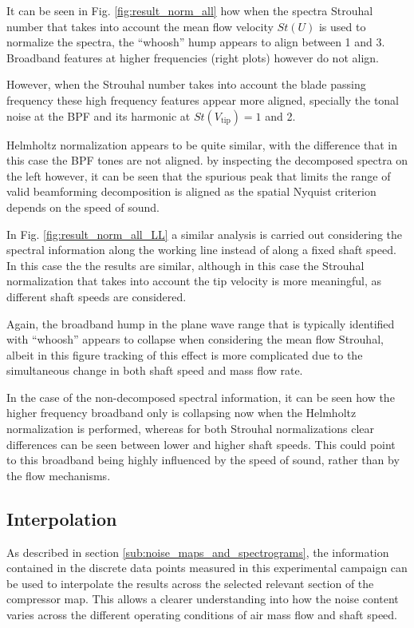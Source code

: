 It can be seen in Fig. \ref{fig:result_norm_all} how when the spectra Strouhal number that takes into account the mean flow velocity $St(U)$ is used to normalize the spectra, the ``whoosh'' hump appears to align between 1 and 3. Broadband features at higher frequencies (right plots) however do not align.

However, when the Strouhal number takes into account the blade passing frequency these high frequency features appear more aligned, specially the tonal noise at the BPF and its harmonic at $St(V_\text{tip})=1$ and 2. 

Helmholtz normalization appears to be quite similar, with the difference that in this case the BPF tones are not aligned. by inspecting the decomposed spectra on the left however, it can be seen that the spurious peak that limits the range of valid beamforming decomposition is aligned as the spatial Nyquist criterion depends on the speed of sound.

In Fig. \ref{fig:result_norm_all_LL} a similar analysis is carried out considering the spectral information along the working line instead of along a fixed shaft speed. In this case the the results are similar, although in this case the Strouhal normalization that takes into account the tip velocity is more meaningful, as different shaft speeds are considered.

Again, the broadband hump in the plane wave range that is typically identified with ``whoosh'' appears to collapse when considering the mean flow Strouhal, albeit in this figure tracking of this effect is more complicated due to the simultaneous change in both shaft speed and mass flow rate. 

In the case of the non-decomposed spectral information, it can be seen how the higher frequency broadband only is collapsing now when the Helmholtz normalization is performed, whereas for both Strouhal normalizations clear differences can be seen between lower and higher shaft speeds. This could point to this broadband being highly influenced by the speed of sound, rather than by the flow mechanisms.

\subsection{Interpolation}

As described in section \ref{sub:noise_maps_and_spectrograms}, the information contained in the discrete data points measured in this experimental campaign can be used to interpolate the results across the selected relevant section of the compressor map. This allows a clearer understanding into how the noise content varies across the different operating conditions of air mass flow and shaft speed.


